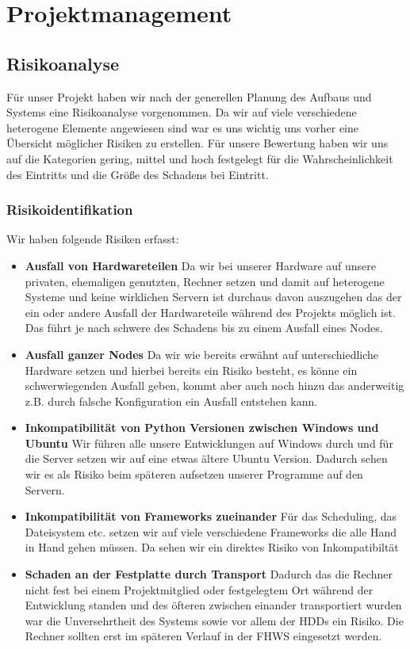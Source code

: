 \documentclass[12pt,oneside,a4paper,parskip]{scrbook}
\begin{document}
\chapter{Projektmanagement}
\section{Risikoanalyse}
Für unser Projekt haben wir nach der generellen Planung des Aufbaus und Systems eine Risikoanalyse vorgenommen. Da wir auf viele verschiedene heterogene Elemente angewiesen sind war es uns wichtig uns vorher eine Übersicht möglicher Risiken zu erstellen. Für unsere Bewertung haben wir uns auf die Kategorien {gering, mittel und hoch} festgelegt für die Wahrscheinlichkeit des Eintritts und die Größe des Schadens bei Eintritt.
\subsection{Risikoidentifikation}
Wir haben folgende Risiken erfasst:

\begin{itemize}
\item\textbf{Ausfall von Hardwareteilen}
Da wir bei unserer Hardware auf unsere privaten, ehemaligen genutzten, Rechner setzen und damit auf heterogene Systeme und keine wirklichen Servern ist durchaus davon auszugehen das der ein oder andere Ausfall der Hardwareteile während des Projekts möglich ist. Das führt je nach schwere des Schadens bis zu einem Ausfall eines Nodes.
\item\textbf{Ausfall ganzer Nodes}
Da wir wie bereits erwähnt auf unterschiedliche Hardware setzen und hierbei bereits ein Risiko besteht, es könne ein schwerwiegenden Ausfall geben, kommt aber auch noch hinzu das anderweitig z.B. durch falsche Konfiguration ein Ausfall entstehen kann.
\item\textbf{Inkompatibilität von Python Versionen zwischen Windows und Ubuntu}
Wir führen alle unsere Entwicklungen auf Windows durch und für die Server setzen wir auf eine etwas ältere Ubuntu Version. Dadurch sehen wir es als Risiko beim späteren aufsetzen unserer Programme auf den Servern.

\pagebreak

\item\textbf{Inkompatibilität von Frameworks zueinander}
Für das Scheduling, das Dateisystem etc. setzen wir auf viele verschiedene Frameworks die alle Hand in Hand gehen müssen. Da sehen wir ein direktes Risiko von Inkompatibiltät
\item\textbf{Schaden an der Festplatte durch Transport}
Dadurch das die Rechner nicht fest bei einem Projektmitglied oder festgelegtem Ort während der Entwicklung standen und des öfteren zwischen einander
transportiert wurden war die Unversehrtheit des Systems sowie vor allem der HDDs ein Risiko. Die Rechner sollten erst im späteren Verlauf in der FHWS eingesetzt werden.
\end{itemize}
\end{document}
